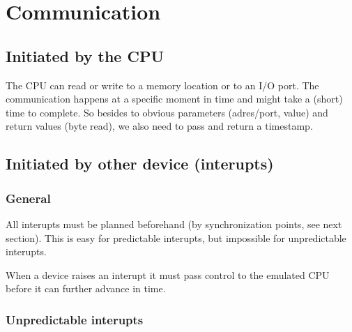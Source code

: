 \documentclass[11pt, a4paper]{report}
\begin{document}
\section{Communication}

\subsection{Initiated by the CPU}

The CPU can read or write to a memory location or to an I/O port. The
communication happens at a specific moment in time and might take a (short) time
to complete. So besides to obvious parameters (adres/port, value) and return
values (byte read), we also need to pass and return a timestamp.


\subsection{Initiated by other device (interupts)}

\subsubsection{General}

All interupts must be planned beforehand (by synchronization points, see next
section). This is easy for predictable interupts, but impossible for
unpredictable interupts. 

When a device raises an interupt it must pass control to the emulated CPU before
it can further advance in time.

\subsubsection{Unpredictable interupts}
\end{document}
